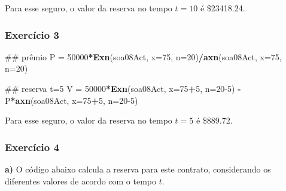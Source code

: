 \documentclass[]{article}
\newenvironment{Shaded}{\begin{snugshade}}{\end{snugshade}}
\newcommand{\DataTypeTok}[1]{\textcolor[rgb]{0.13,0.29,0.53}{#1}}
\newcommand{\DecValTok}[1]{\textcolor[rgb]{0.00,0.00,0.81}{#1}}
\newcommand{\KeywordTok}[1]{\textcolor[rgb]{0.13,0.29,0.53}{\textbf{#1}}}
\newcommand{\NormalTok}[1]{#1}
\newcommand{\OperatorTok}[1]{\textcolor[rgb]{0.81,0.36,0.00}{\textbf{#1}}}
\newcommand{\StringTok}[1]{\textcolor[rgb]{0.31,0.60,0.02}{#1}}
\begin{document}
Para esse seguro, o valor da reserva no tempo \(t=10\) é \$23418.24.

\hypertarget{exercicio-3}{%
\subsubsection{Exercício 3}\label{exercicio-3}}

\begin{Shaded}
\begin{Highlighting}[]
\NormalTok{## prêmio}
\NormalTok{P =}\StringTok{ }\DecValTok{50000}\OperatorTok{*}\KeywordTok{Exn}\NormalTok{(soa08Act, }\DataTypeTok{x=}\DecValTok{75}\NormalTok{, }\DataTypeTok{n=}\DecValTok{20}\NormalTok{)}\OperatorTok{/}\KeywordTok{axn}\NormalTok{(soa08Act, }\DataTypeTok{x=}\DecValTok{75}\NormalTok{, }\DataTypeTok{n=}\DecValTok{20}\NormalTok{)}

\NormalTok{## reserva t=5}
\NormalTok{V =}\StringTok{ }\DecValTok{50000}\OperatorTok{*}\KeywordTok{Exn}\NormalTok{(soa08Act, }\DataTypeTok{x=}\DecValTok{75}\OperatorTok{+}\DecValTok{5}\NormalTok{, }\DataTypeTok{n=}\DecValTok{20-5}\NormalTok{) }\OperatorTok{-}\StringTok{ }\NormalTok{P}\OperatorTok{*}\KeywordTok{axn}\NormalTok{(soa08Act, }\DataTypeTok{x=}\DecValTok{75}\OperatorTok{+}\DecValTok{5}\NormalTok{, }\DataTypeTok{n=}\DecValTok{20-5}\NormalTok{)}
\end{Highlighting}
\end{Shaded}

Para esse seguro, o valor da reserva no tempo \(t=5\) é \$889.72.

\hypertarget{exercicio-4}{%
\subsubsection{Exercício 4}\label{exercicio-4}}

\textbf{a)} O código abaixo calcula a reserva para este contrato,
considerando os diferentes valores de acordo com o tempo \(t\).
\end{document}
